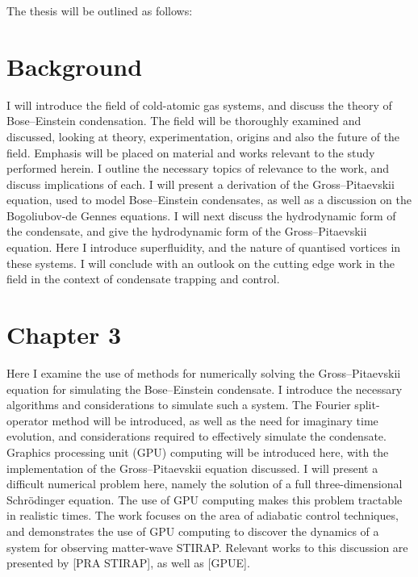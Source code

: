The thesis will be outlined as follows:

\section{Background}
I will introduce the field of cold-atomic gas systems, and discuss the theory of Bose--Einstein condensation. The field will be thoroughly examined and discussed, looking at theory, experimentation, origins and also the future of the field. Emphasis will be placed on material and works relevant to the study performed herein. I outline the necessary topics of relevance to the work, and discuss implications of each. I will present a derivation of the Gross--Pitaevskii equation, used to model Bose--Einstein condensates, as well as a discussion on the Bogoliubov-de Gennes equations. I will next discuss the hydrodynamic form of the condensate, and give the hydrodynamic form of the Gross--Pitaevskii equation. Here I introduce superfluidity, and the nature of quantised vortices in these systems. I will conclude with an outlook on the cutting edge work in the field in the context of condensate trapping and control.


\section{Chapter 3}
Here I examine the use of methods for numerically solving the Gross--Pitaevskii equation for simulating the Bose--Einstein condensate. I introduce the necessary algorithms and considerations to simulate such a system. The Fourier split-operator method will be introduced, as well as the need for imaginary time evolution, and considerations required to effectively simulate the condensate. Graphics processing unit (GPU) computing will be introduced here, with the implementation of the Gross--Pitaevskii equation discussed. I will present a difficult numerical problem here, namely the solution of a full three-dimensional Schr\"odinger equation. The use of GPU computing makes this problem tractable in realistic times. The work focuses on the area of adiabatic control techniques, and demonstrates the use of GPU computing to discover the dynamics of a system for observing matter-wave STIRAP. Relevant works to this discussion are presented by [PRA STIRAP]\cite{}, as well as [GPUE]\cite{}.

